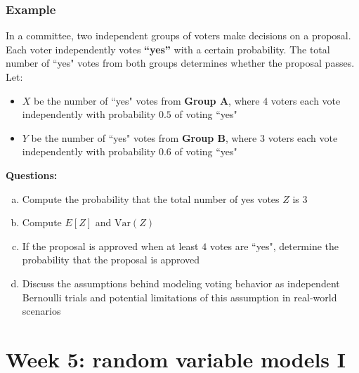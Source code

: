 \documentclass[t,8pt]{beamer}%
\begin{document}
    \begin{frame}
		\frametitle{Example}
		In a committee, two independent groups of voters make decisions on a proposal. Each voter independently votes \textbf{``yes''} with a certain probability. The total number of ``yes" votes from both groups determines whether the proposal passes. Let:
    \begin{itemize}
        \item $X$ be the number of ``yes" votes from \textbf{Group A}, where $4$ voters each vote independently with probability $0.5$ of voting ``yes"
        \item $Y$ be the number of ``yes" votes from \textbf{Group B}, where $3$ voters each vote independently with probability $0.6$ of voting ``yes"
    \end{itemize}
\textbf{Questions:}
\begin{enumerate}[(a)]
    \item Compute the probability that the total number of yes votes $Z$ is $3$
    \item Compute $E[Z]$ and $\text{Var}(Z)$
    \item If the proposal is approved when at least $4$ votes are ``yes", determine the probability that the proposal is approved
    \item Discuss the assumptions behind modeling voting behavior as independent Bernoulli trials and potential limitations of this assumption in real-world scenarios
\end{enumerate}
\end{frame}


\section{Week 5: random variable models I}
	
\end{document}

